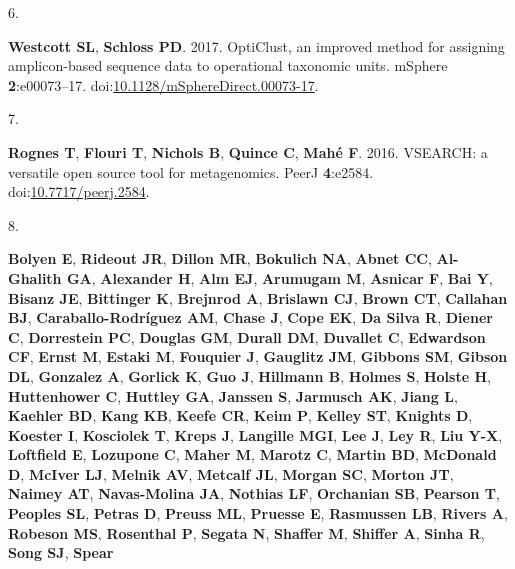 \documentclass[
]{article}
\newlength{\cslhangindent}
\newlength{\csllabelwidth}
\newlength{\cslentryspacingunit} %
\newenvironment{CSLReferences}[2] %
 {%
  \setlength{\parindent}{0pt}
  \ifodd #1
  \let\oldpar\par
  \def\par{\hangindent=\cslhangindent\oldpar}
  \fi
  \setlength{\parskip}{#2\cslentryspacingunit}
 }%
 {}
\newcommand{\CSLLeftMargin}[1]{\parbox[t]{\csllabelwidth}{#1}}
\newcommand{\CSLRightInline}[1]{\parbox[t]{\linewidth - \csllabelwidth}{#1}\break}
\begin{document}
\begin{CSLReferences}{0}{1}
\leavevmode{}%
\CSLLeftMargin{6. }%
\CSLRightInline{\textbf{Westcott SL}, \textbf{Schloss PD}. 2017.
OptiClust, an improved method for assigning amplicon-based sequence data
to operational taxonomic units. mSphere \textbf{2}:e00073--17.
doi:\href{https://doi.org/10.1128/mSphereDirect.00073-17}{10.1128/mSphereDirect.00073-17}.}

\leavevmode{}%
\CSLLeftMargin{7. }%
\CSLRightInline{\textbf{Rognes T}, \textbf{Flouri T}, \textbf{Nichols
B}, \textbf{Quince C}, \textbf{Mahé F}. 2016. VSEARCH: a versatile open
source tool for metagenomics. PeerJ \textbf{4}:e2584.
doi:\href{https://doi.org/10.7717/peerj.2584}{10.7717/peerj.2584}.}

\leavevmode{}%
\CSLLeftMargin{8. }%
\CSLRightInline{\textbf{Bolyen E}, \textbf{Rideout JR}, \textbf{Dillon
MR}, \textbf{Bokulich NA}, \textbf{Abnet CC}, \textbf{Al-Ghalith GA},
\textbf{Alexander H}, \textbf{Alm EJ}, \textbf{Arumugam M},
\textbf{Asnicar F}, \textbf{Bai Y}, \textbf{Bisanz JE},
\textbf{Bittinger K}, \textbf{Brejnrod A}, \textbf{Brislawn CJ},
\textbf{Brown CT}, \textbf{Callahan BJ}, \textbf{Caraballo-Rodríguez
AM}, \textbf{Chase J}, \textbf{Cope EK}, \textbf{Da Silva R},
\textbf{Diener C}, \textbf{Dorrestein PC}, \textbf{Douglas GM},
\textbf{Durall DM}, \textbf{Duvallet C}, \textbf{Edwardson CF},
\textbf{Ernst M}, \textbf{Estaki M}, \textbf{Fouquier J},
\textbf{Gauglitz JM}, \textbf{Gibbons SM}, \textbf{Gibson DL},
\textbf{Gonzalez A}, \textbf{Gorlick K}, \textbf{Guo J},
\textbf{Hillmann B}, \textbf{Holmes S}, \textbf{Holste H},
\textbf{Huttenhower C}, \textbf{Huttley GA}, \textbf{Janssen S},
\textbf{Jarmusch AK}, \textbf{Jiang L}, \textbf{Kaehler BD},
\textbf{Kang KB}, \textbf{Keefe CR}, \textbf{Keim P}, \textbf{Kelley
ST}, \textbf{Knights D}, \textbf{Koester I}, \textbf{Kosciolek T},
\textbf{Kreps J}, \textbf{Langille MGI}, \textbf{Lee J}, \textbf{Ley R},
\textbf{Liu Y-X}, \textbf{Loftfield E}, \textbf{Lozupone C},
\textbf{Maher M}, \textbf{Marotz C}, \textbf{Martin BD},
\textbf{McDonald D}, \textbf{McIver LJ}, \textbf{Melnik AV},
\textbf{Metcalf JL}, \textbf{Morgan SC}, \textbf{Morton JT},
\textbf{Naimey AT}, \textbf{Navas-Molina JA}, \textbf{Nothias LF},
\textbf{Orchanian SB}, \textbf{Pearson T}, \textbf{Peoples SL},
\textbf{Petras D}, \textbf{Preuss ML}, \textbf{Pruesse E},
\textbf{Rasmussen LB}, \textbf{Rivers A}, \textbf{Robeson MS},
\textbf{Rosenthal P}, \textbf{Segata N}, \textbf{Shaffer M},
\textbf{Shiffer A}, \textbf{Sinha R}, \textbf{Song SJ}, \textbf{Spear
}}
\end{CSLReferences}
\end{document}
